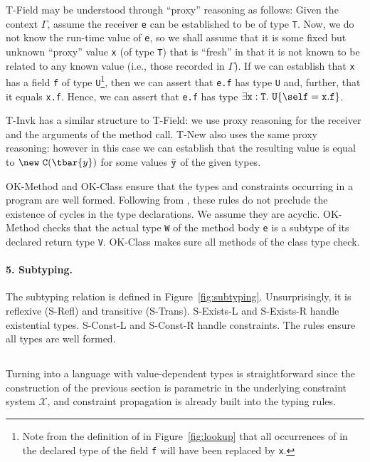 {\sc T-Field} may be understood through ``proxy'' reasoning as
follows:  Given the context $\Gamma$, assume the receiver {\tt e} can
be established to be of type {\tt T}. Now, we do not know the run-time
value of {\tt e}, so we shall assume that it is some fixed but unknown
``proxy'' value {\tt x} (of type {\tt T}) that is ``fresh'' in that it
is not known to be related to any known value (i.e., those recorded
in $\Gamma$).  If we can establish that {\tt x} has a field {\tt f} of
type {\tt U}\footnote{Note from the definition of
\fields{} in Figure~\ref{fig:lookup} that all occurrences of
\this{} in the declared type of the field {\tt f} will have been replaced
by {\tt x}.}, then we can assert that
{\tt e.f} has type {\tt U} and, further, that it equals {\tt x.f}.
Hence, we can assert that {\tt e.f} has type 
$\exists {\tt x}:{\tt T}.~{\tt U}\{\self={\tt x}.{\tt f}\}$.

{\sc T-Invk} has a similar structure to {\sc T-Field}: we use
proxy reasoning for the receiver and the arguments of the method
call. {\sc T-New} also uses the same proxy reasoning: however in this case
we can establish that the resulting value is equal to $\new~{\tt C}(\tbar{y})$
for some values $\bar{\tt y}$ of the given types.

{\sc OK-Method} and {\sc OK-Class} ensure that the types and constraints occurring in a program are well formed. Following from \FJ{}, these rules do not preclude the existence of cycles in the type declarations. We assume they are acyclic. {\sc OK-Method} checks that the actual type {\tt W} of the method body {\tt e} is a subtype of its declared return type {\tt V}. {\sc OK-Class} makes sure all methods of the class type check.


\paragraph{5. Subtyping.} The subtyping relation is defined in Figure~\ref{fig:subtyping}.
Unsurprisingly, it is reflexive ({\sc S-Refl}) and transitive ({\sc S-Trans}).
{\sc S-Exists-L} and {\sc S-Exists-R} handle existential types.
{\sc S-Const-L} and {\sc S-Const-R} handle constraints. The rules ensure all types are well formed.

\subsection{\FXD}

Turning \FXZ{} into a language with value-dependent types is straightforward
since the construction of the previous section is parametric in the underlying constraint system $\mathcal{X}$, and constraint propagation is already built into the typing rules.

